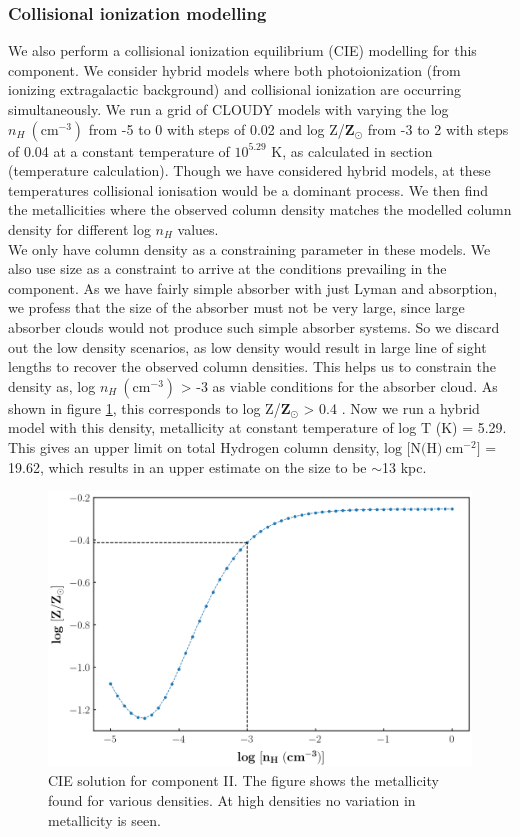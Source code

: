 \subsubsection{Collisional ionization modelling}

We also perform a collisional ionization equilibrium (CIE) modelling for this component. We consider hybrid models where both photoionization (from ionizing extragalactic background) and collisional ionization are occurring simultaneously. We run a grid of CLOUDY models with varying the log $n_H \ (\text{cm}^{-3})$ from -5 to 0 with steps of 0.02 and log Z/$\mathbf{\text{Z}_{\odot}}$ from -3 to 2 with steps of 0.04 at a constant temperature of $10^{5.29}$ K, as calculated in section (temperature calculation). Though we have considered hybrid models, at these temperatures collisional ionisation would be a dominant process. We then find the metallicities where the observed  column density matches the modelled column density for different log $n_H$ values.  
\\
We only have  column density as a constraining parameter in these models. We also use size as a constraint to arrive at the conditions prevailing in the component. As we have fairly simple absorber with just Lyman and  absorption, we profess that the size of the absorber must not be very large, since large absorber clouds would not produce such simple absorber systems. So we discard out the low density scenarios, as low density would result in large line of sight lengths to recover the observed column densities. This helps us to constrain the density as, log $n_H \ (\text{cm}^{-3})$ > -3 as viable conditions for the absorber cloud. As shown in figure \ref{fig:comp_II_CIE}, this corresponds to log Z/$\mathbf{\text{Z}_{\odot}}$ > 0.4 . Now we run a hybrid model with this density, metallicity at constant temperature of log T (K) = 5.29. This gives an upper limit on total  Hydrogen column density, $\text{log [N(H)} \ \text{cm}^{-2}]$ = 19.62, which results in an upper estimate on the size to be $\sim$13 kpc.
%
\begin{figure}[!t]
\includegraphics[width=\linewidth]{Figures/comp-II-CIE.png}
\caption{CIE solution for component II. The figure shows the metallicity found for various densities. At high densities no variation in metallicity is seen.}
\label{fig:comp_II_CIE}
\end{figure}

